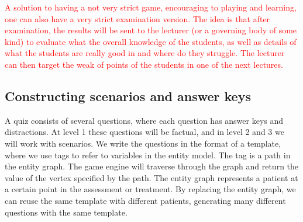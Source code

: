 


\textcolor{red}{A solution to having a not very strict game, encouraging to playing and learning, one can also have a very strict examination version. The idea is that after examination, the results will be sent to the lecturer (or a governing body of some kind) to evaluate what the overall knowledge of the students, as well as details of what the students are really good in and where do they struggle. The lecturer can then target the weak of points of the students in one of the next lectures. }

\subsection{Constructing scenarios and answer keys}
A quiz consists of several questions, where each question has answer keys and distractions. At level 1 these questions will be factual, and in level 2 and 3 we will work with scenarios. We write the questions in the format of a template, where we use tags to refer to variables in the entity model. The tag is a path in the entity graph. The game engine will traverse through the graph and return the value of the vertex specified by the path. The entity graph represents a patient at a certain point in the assessment or treatment. By replacing the entity graph, we can reuse the same template with different patients, generating many different questions with the same template. 

